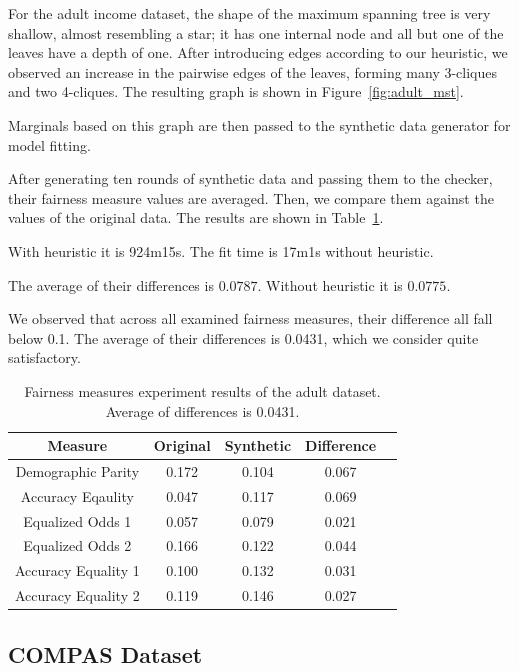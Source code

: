 \documentclass[manuscript,screen,review,anonymous]{acmart}
\begin{document}
For the adult income dataset, the shape of the maximum spanning tree is very shallow, almost resembling a star; it has one internal node and all but one of the leaves have a depth of one. After introducing edges according to our heuristic, we observed an increase in the pairwise edges of the leaves, forming many 3-cliques and two 4-cliques. The resulting graph is shown in Figure~\ref{fig:adult_mst}.

Marginals based on this graph are then passed to the synthetic data generator for model fitting.

After generating ten rounds of synthetic data and passing them to the checker, their fairness measure values are averaged. Then, we compare them against the values of the original data. The results are shown in Table~\ref{tab:adult_score}.


With heuristic it is 924m15s. The fit time is 17m1s without heuristic.

The average of their differences is $0.0787$. Without heuristic it is $0.0775$.

We observed that across all examined fairness measures, their difference all fall below 0.1. The average of their differences is 0.0431, which we consider quite satisfactory.

\begin{table}[h]
\caption{Fairness measures experiment results of the adult dataset. Average of differences is 0.0431.}
\label{tab:adult_score}
\begin{tabular}{ccccc}
\toprule
\textbf{Measure} & \textbf{Original} & \textbf{Synthetic} & \textbf{Difference} \\
\midrule
Demographic Parity  & 0.172 & 0.104 & 0.067 \\
Accuracy Eqaulity   & 0.047 & 0.117 & 0.069 \\
Equalized Odds 1    & 0.057 & 0.079 & 0.021 \\
Equalized Odds 2    & 0.166 & 0.122 & 0.044 \\
Accuracy Equality 1 & 0.100 & 0.132 & 0.031 \\
Accuracy Equality 2 & 0.119 & 0.146 & 0.027 \\
\bottomrule
\end{tabular}
\end{table}

\subsection{COMPAS Dataset}
\end{document}
